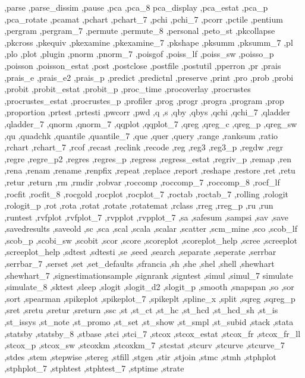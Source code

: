 {{    ,parse ,parse_dissim ,pause ,pca ,pca_8 pca_display ,pca_estat
    ,pca_p ,pca_rotate ,pcamat ,pchart ,pchart_7 ,pchi ,pchi_7 ,pcorr
    ,pctile ,pentium ,pergram ,pergram_7 ,permute ,permute_8 ,personal
    ,peto_st ,pkcollapse ,pkcross ,pkequiv ,pkexamine ,pkexamine_7
    ,pkshape ,pksumm ,pksumm_7 ,pl ,plo ,plot ,plugin ,pnorm ,pnorm_7
    ,poisgof ,poiss_lf ,poiss_sw ,poisso_p ,poisson ,poisson_estat
    ,post ,postclose ,postfile ,postutil ,pperron ,pr ,prais ,prais_e
    ,prais_e2 ,prais_p ,predict ,predictnl ,preserve ,print ,pro ,prob
    ,probi ,probit ,probit_estat ,probit_p ,proc_time ,procoverlay
    ,procrustes ,procrustes_estat ,procrustes_p ,profiler ,prog ,progr
    ,progra ,program ,prop ,proportion ,prtest ,prtesti ,pwcorr ,pwd
    ,q ,s ,qby ,qbys ,qchi ,qchi_7 ,qladder ,qladder_7 ,qnorm ,qnorm_7
    ,qqplot ,qqplot_7 ,qreg ,qreg_c ,qreg_p ,qreg_sw ,qu ,quadchk
    ,quantile ,quantile_7 ,que ,quer ,query ,range ,ranksum ,ratio
    ,rchart ,rchart_7 ,rcof ,recast ,reclink ,recode ,reg ,reg3
    ,reg3_p ,regdw ,regr ,regre ,regre_p2 ,regres ,regres_p ,regress
    ,regress_estat ,regriv_p ,remap ,ren ,rena ,renam ,rename ,renpfix
    ,repeat ,replace ,report ,reshape ,restore ,ret ,retu ,retur ,return
    ,rm ,rmdir ,robvar ,roccomp ,roccomp_7 ,roccomp_8 ,rocf_lf ,rocfit
    ,rocfit_8 ,rocgold ,rocplot ,rocplot_7 ,roctab ,roctab_7 ,rolling
    ,rologit ,rologit_p ,rot ,rota ,rotat ,rotate ,rotatemat ,rclass ,rreg
    ,rreg_p ,ru ,run ,runtest ,rvfplot ,rvfplot_7 ,rvpplot ,rvpplot_7
    ,sa ,safesum ,sampsi ,sav ,save ,savedresults ,saveold ,sc
    ,sca ,scal ,scala ,scalar ,scatter ,scm_mine ,sco ,scob_lf ,scob_p
    ,scobi_sw ,scobit ,scor ,score ,scoreplot ,scoreplot_help ,scree
    ,screeplot ,screeplot_help ,sdtest ,sdtesti ,se ,seed ,search ,separate
    ,seperate ,serrbar ,serrbar_7 ,serset ,set ,set_defaults ,sfrancia
    ,sh ,she ,shel ,shell ,shewhart ,shewhart_7 ,signestimationsample
    ,signrank ,signtest ,simul ,simul_7 simulate ,simulate_8 ,sktest
    ,sleep ,slogit ,slogit_d2 ,slogit_p ,smooth ,snapspan ,so ,sor
    ,sort ,spearman ,spikeplot ,spikeplot_7 ,spikeplt ,spline_x ,split
    ,sqreg ,sqreg_p ,sret ,sretu ,sretur ,sreturn ,ssc ,st ,st_ct ,st_hc
    ,st_hcd ,st_hcd_sh ,st_is ,st_issys ,st_note ,st_promo ,st_set
    ,st_show ,st_smpl ,st_subid ,stack ,stata ,statsby ,statsby_8 ,stbase
    ,stci ,stci_7 ,stcox ,stcox_estat ,stcox_fr ,stcox_fr_ll ,stcox_p
    ,stcox_sw ,stcoxkm ,stcoxkm_7 ,stcstat ,stcurv ,stcurve ,stcurve_7
    ,stdes ,stem ,stepwise ,stereg ,stfill ,stgen ,stir ,stjoin ,stmc
    ,stmh ,stphplot ,stphplot_7 ,stphtest ,stphtest_7 ,stptime ,strate
}}
